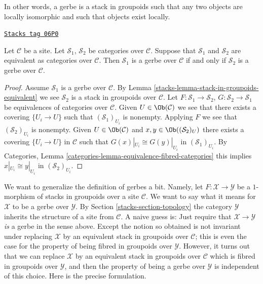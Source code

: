 In other words, a gerbe is a stack in groupoids such that any two objects
are locally isomorphic and such that objects exist locally.

\begin{lemma}
\label{stacks-lemma-gerbe-equivalent}
\href{https://stacks.math.columbia.edu/tag/06P0}{\texttt{Stacks tag 06P0}}

Let $\mathcal{C}$ be a site.
Let $\mathcal{S}_1$, $\mathcal{S}_2$ be categories over $\mathcal{C}$.
Suppose that $\mathcal{S}_1$ and $\mathcal{S}_2$ are equivalent
as categories over $\mathcal{C}$.
Then $\mathcal{S}_1$ is a gerbe over $\mathcal{C}$ if and only if
$\mathcal{S}_2$ is a gerbe over $\mathcal{C}$.
\end{lemma}

\begin{proof}

Assume $\mathcal{S}_1$ is a gerbe over $\mathcal{C}$. By
Lemma \ref{stacks-lemma-stack-in-groupoids-equivalent}
we see $\mathcal{S}_2$ is a stack in groupoids over $\mathcal{C}$.
Let $F : \mathcal{S}_1 \to \mathcal{S}_2$,
$G : \mathcal{S}_2 \to \mathcal{S}_1$ be equivalences of categories over
$\mathcal{C}$. Given $U \in \Ob(\mathcal{C})$ we see that there exists
a covering $\{U_i \to U\}$ such that $(\mathcal{S}_1)_{U_i}$ is
nonempty. Applying $F$ we see that $(\mathcal{S}_2)_{U_i}$ is nonempty.
Given $U \in \Ob(\mathcal{C})$ and
$x, y \in \Ob((\mathcal{S}_2)_U)$ there exists
a covering $\{U_i \to U\}$ in $\mathcal{C}$ such that
$G(x)|_{U_i} \cong G(y)|_{U_i}$ in $(\mathcal{S}_1)_{U_i}$. By
Categories, Lemma \ref{categories-lemma-equivalence-fibred-categories}
this implies $x|_{U_i} \cong y|_{U_i}$ in $(\mathcal{S}_2)_{U_i}$.
\end{proof}

We want to generalize the definition of gerbes a bit. Namely, let
$F : \mathcal{X} \to \mathcal{Y}$ be a $1$-morphism of stacks in groupoids
over a site $\mathcal{C}$. We want to say what it
means for $\mathcal{X}$ to be a gerbe over $\mathcal{Y}$. By
Section \ref{stacks-section-topology}
the category $\mathcal{Y}$ inherits the structure of a site from
$\mathcal{C}$. A naive guess is: Just require that
$\mathcal{X} \to \mathcal{Y}$ {\it is} a gerbe in the sense above. Except
the notion so obtained is not invariant under replacing $\mathcal{X}$
by an equivalent stack in groupoids over $\mathcal{C}$; this is even the
case for the property of being fibred in groupoids over $\mathcal{Y}$.
However, it turns out that we can replace $\mathcal{X}$ by an equivalent
stack in groupoids over $\mathcal{C}$ which is fibred in groupoids over
$\mathcal{Y}$, and then the property of being a gerbe over $\mathcal{Y}$
is independent of this choice. Here is the precise formulation.

